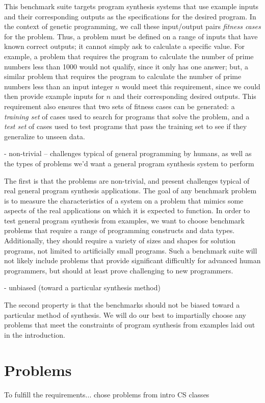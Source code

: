\documentclass{sig-alternate}
\begin{document}
This benchmark suite targets program synthesis systems that use example inputs and their corresponding outputs as the specifications for the desired program. In the context of genetic programming, we call these input/output pairs \textit{fitness cases} for the problem. Thus, a problem must be defined on a range of inputs that have known correct outputs; it cannot simply ask to calculate a specific value. For example, a problem that requires the program to calculate the number of prime numbers less than 1000 would not qualify, since it only has one answer; but, a similar problem that requires the program to calculate the number of prime numbers less than an input integer $n$ would meet this requirement, since we could then provide example inputs for $n$ and their corresponding desired outputs. This requirement also ensures that two sets of fitness cases can be generated: a \textit{training set} of cases used to search for programs that solve the problem, and a \textit{test set} of cases used to test programs that pass the training set to see if they generalize to unseen data.


- non-trivial -- challenges typical of general programming by humans, as well as the types of problems we’d want a general program synthesis system to perform

The first is that the problems are non-trivial, and present challenges typical of real general program synthesis applications. The goal of any benchmark problem is to measure the characteristics of a system on a problem that mimics some aspects of the real applications on which it is expected to function. In order to test general program synthesis from examples, we want to choose benchmark problems that require a range of programming constructs and data types. Additionally, they should require a variety of sizes and shapes for solution programs, not limited to artificially small programs. Such a benchmark suite will not likely include problems that provide significant difficultly for advanced human programmers, but should at least prove challenging to new programmers.

- unbiased (toward a particular synthesis method)

The second property is that the benchmarks should not be biased toward a particular method of synthesis. We will do our best to impartially choose any problems that meet the constraints of program synthesis from examples laid out in the introduction.



\section{Problems}
To fulfill the requirements... chose problems from intro CS classes
\end{document}
